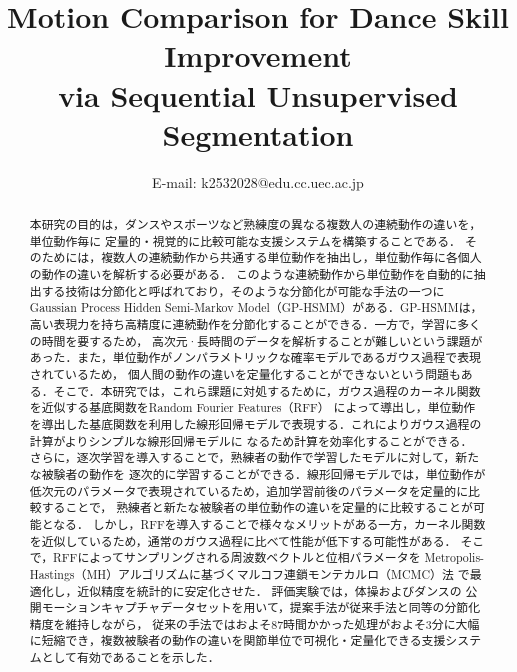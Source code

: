 \documentclass[conference]{IEEEtran}
\begin{document}
\title{Motion Comparison for Dance Skill Improvement \\via Sequential Unsupervised Segmentation}

\author{
E-mail: k2532028@edu.cc.uec.ac.jp}


\maketitle

\begin{abstract}
本研究の目的は，ダンスやスポーツなど熟練度の異なる複数人の連続動作の違いを，単位動作毎に
定量的・視覚的に比較可能な支援システムを構築することである．
そのためには，複数人の連続動作から共通する単位動作を抽出し，単位動作毎に各個人の動作の違いを解析する必要がある．
このような連続動作から単位動作を自動的に抽出する技術は分節化と呼ばれており，そのような分節化が可能な手法の一つに
Gaussian Process Hidden Semi-Markov Model（GP-HSMM）がある．GP-HSMMは，高い表現力を持ち高精度に連続動作を分節化することができる．一方で，学習に多くの時間を要するため，
高次元·長時間のデータを解析することが難しいという課題があった．また，単位動作がノンパラメトリックな確率モデルであるガウス過程で表現されているため，
個人間の動作の違いを定量化することができないという問題もある．そこで．本研究では，これら課題に対処するために，ガウス過程のカーネル関数を近似する基底関数をRandom Fourier Features（RFF）
によって導出し，単位動作を導出した基底関数を利用した線形回帰モデルで表現する．これによりガウス過程の計算がよりシンプルな線形回帰モデルに
なるため計算を効率化することができる．
さらに，逐次学習を導入することで，熟練者の動作で学習したモデルに対して，新たな被験者の動作を
逐次的に学習することができる．線形回帰モデルでは，単位動作が低次元のパラメータで表現されているため，追加学習前後のパラメータを定量的に比較することで，
熟練者と新たな被験者の単位動作の違いを定量的に比較することが可能となる．
しかし，RFFを導入することで様々なメリットがある一方，カーネル関数を近似しているため，通常のガウス過程に比べて性能が低下する可能性がある．
そこで，RFFによってサンプリングされる周波数ベクトルと位相パラメータを Metropolis-Hastings（MH）アルゴリズムに基づくマルコフ連鎖モンテカルロ（MCMC）法\cite{Hastings1970} で最適化し，近似精度を統計的に安定化させた．
評価実験では，体操およびダンスの
公開モーションキャプチャデータセットを用いて，提案手法が従来手法と同等の分節化精度を維持しながら，
従来の手法ではおよそ87時間かかった処理がおよそ3分に大幅に短縮でき，複数被験者の動作の違いを関節単位で可視化・定量化できる支援システムとして有効であることを示した．
\end{abstract}
\end{document}
